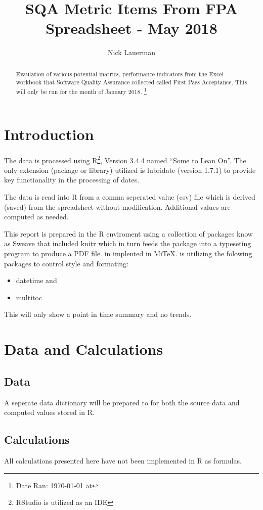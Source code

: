 \documentclass{article}
\title{SQA Metric Items From FPA Spreadsheet - May 2018}
\author{Nick Lauerman}
\date{}
\begin{document}

\maketitle

\begin{abstract}
Evaulation of various potential matrics, performance indicators from the Excel
workbook that Software Quality Assurance collected called First Pass
Acceptance. This will only be run for the month of January 2018.
\footnote{Date Ran: \today{} at \currenttime}
\end{abstract}

\tableofcontents

\section{Introduction}
The data is processed using R\footnote{RStudio is utilized as an IDE}, Version
3.4.4 named ``Some to Lean On''. The only extension (package or library) utilized is
lubridate (version 1.7.1) to provide key functionality in the processing of dates.

The data is read into R from a comma seperated value (csv) file which is derived (saved)
from the spreadsheet without modification. Additional values are computed as needed.

This report is prepared in the R enviroment using a collection of packages know as
Sweave that included knitr which in turn feeds the package into \LaTeXe{} a typeseting
program to produce a PDF file. \LaTeXe{} in implented in Mi\TeX. \LaTeXe{} is utilizing
the folowing packages to control style and formating:
\begin{itemize}
\item datetime and
\item multitoc
\end{itemize}

This will only show a point in time summary and no trends.

\section{Data and Calculations}
\subsection{Data}
A seperate data dictionary will be prepared to for both the source data
and computed values stored in R.

\subsection{Calculations}
All calculations presented here have not been implemented in R as formulas.
\end{document}
